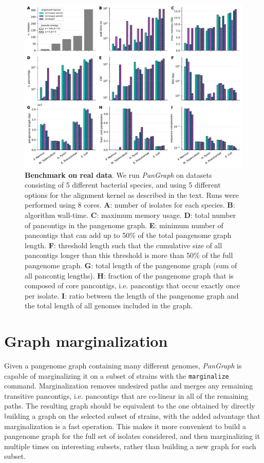 \documentclass[aps,rmp,reprint,superscriptaddress,notitlepage,10pt,onecolumn]{revtex4-1}
\begin{document}
\begin{figure}[htb]
    \includegraphics[width=\textwidth]{figs_suppl/panx_benchmark_suppl.pdf}
    \caption{{\bf Benchmark on real data}. We run \textit{PanGraph} on datasets consisting of 5 different bacterial species, and using 5 different options for the alignment kernel as described in the text. Runs were performed using 8 cores.
        \textbf{A}: number of isolates for each species.
        \textbf{B}: algorithm wall-time.
        \textbf{C}: maximum memory usage.
        \textbf{D}: total number of pancontigs in the pangenome graph.
        \textbf{E}: minimum number of pancontigs that can add up to 50\% of the total pangenome graph length.
        \textbf{F}: threshold length such that the cumulative size of all pancontigs longer than this threshold is more than 50\% of the full pangenome graph.
        \textbf{G}: total length of the pangenome graph (sum of all pancontig lengths).
        \textbf{H}: fraction of the pangenome graph that is composed of core pancontigs, i.e. pancontigs that occur exactly once per isolate.
        \textbf{I}: ratio between the length of the pangenome graph and the total length of all genomes included in the graph.
    }
    \label{fig:panx-benchmark-suppl}
\end{figure}


\section{Graph marginalization}

Given a pangenome graph containing many different genomes, \textit{PanGraph} is capable of marginalizing it on a subset of strains with the \verb|marginalize| command. Marginalization removes undesired paths and merges any remaining transitive pancontigs, i.e. pancontigs that are co-linear in all of the remaining paths.
The resulting graph should be equivalent to the one obtained by directly building a graph on the selected subset of strains, with the added advantage that marginalization is a fast operation. This makes it more convenient to build a pangenome graph for the full set of isolates considered, and then marginalizing it multiple times on interesting subsets, rather than building a new graph for each subset.
\end{document}
